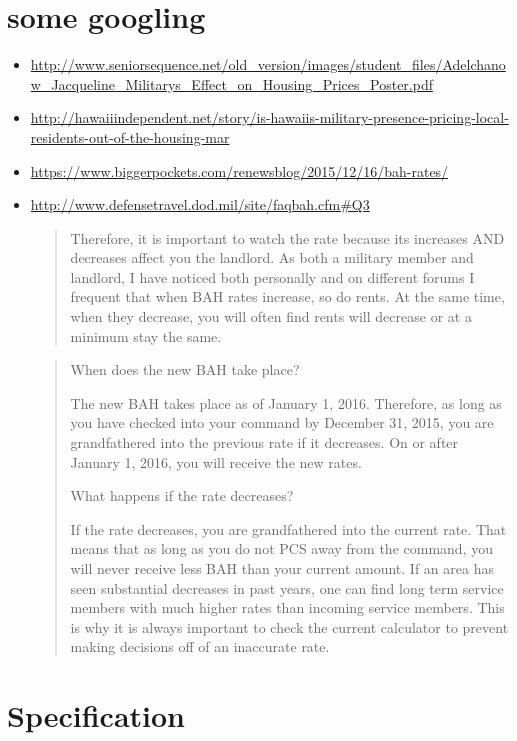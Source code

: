 \documentclass{article}
\begin{document}
\section{some googling}
\begin{itemize}
\item \url{http://www.seniorsequence.net/old_version/images/student_files/Adelchanow_Jacqueline_Militarys_Effect_on_Housing_Prices_Poster.pdf}
\item \url{http://hawaiiindependent.net/story/is-hawaiis-military-presence-pricing-local-residents-out-of-the-housing-mar}
\item \url{https://www.biggerpockets.com/renewsblog/2015/12/16/bah-rates/}
\item \url{http://www.defensetravel.dod.mil/site/faqbah.cfm#Q3}
  \begin{quote}
    Therefore, it is important to watch the rate because its increases AND decreases affect you the landlord. As both a military member and landlord, I have noticed both personally and on different forums I frequent that when BAH rates increase, so do rents. At the same time, when they decrease, you will often find rents will decrease or at a minimum stay the same.
\end{quote}
\begin{quote}
When does the new BAH take place?

The new BAH takes place as of January 1, 2016. Therefore, as long as you have checked into your command by December 31, 2015, you are grandfathered into the previous rate if it decreases. On or after January 1, 2016, you will receive the new rates.

What happens if the rate decreases?

If the rate decreases, you are grandfathered into the current rate. That means that as long as you do not PCS away from the command, you will never receive less BAH than your current amount. If an area has seen substantial decreases in past years, one can find long term service members with much higher rates than incoming service members. This is why it is always important to check the current calculator to prevent making decisions off of an inaccurate rate.
\end{quote}
\end{itemize}

\section{Specification}
\end{document}
